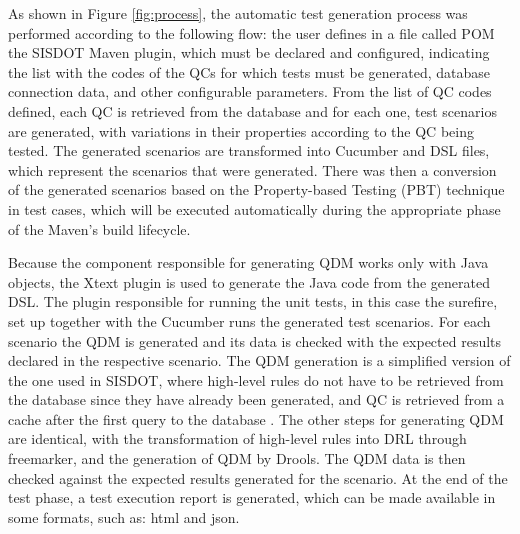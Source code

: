 \documentclass[AMA,STIX1COL,hidelinks]{WileyNJD-v2}
\begin{document}
As shown in Figure \ref{fig:process}, the automatic test generation process was performed according to the following flow: the user defines in a file called POM the SISDOT Maven plugin, which must be declared and configured, indicating the list with the codes of the QCs for which tests must be generated, database connection data, and other configurable parameters. From the list of QC codes defined, each QC is retrieved from the database and for each one, test scenarios are generated, with variations in their properties according to the QC being tested. The generated scenarios are transformed into Cucumber and DSL files, which represent the scenarios that were generated. There was then a conversion of the generated scenarios based on the Property-based Testing (PBT) technique in test cases, which will be executed automatically during the appropriate phase of the Maven's build lifecycle.


Because the component responsible for generating QDM works only with Java objects, the Xtext plugin is used to generate the Java code from the generated DSL. The plugin responsible for running the unit tests, in this case the surefire, set up together with the Cucumber runs the generated test scenarios. For each scenario the QDM is generated and its data is checked with the expected results declared in the respective scenario. The QDM generation is a simplified version of the one used in SISDOT, where high-level rules do not have to be retrieved from the database since they have already been generated, and QC is retrieved from a cache after the first query to the database . The other steps for generating QDM are identical, with the transformation of high-level rules into DRL through freemarker, and the generation of QDM by Drools. The QDM data is then checked against the expected results generated for the scenario. At the end of the test phase, a test execution report is generated, which can be made available in some formats, such as: html and json.
\end{document}
